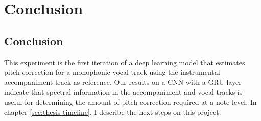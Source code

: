 \chapter{Conclusion}

\section{Conclusion}
This experiment is the first iteration of a deep learning model that estimates pitch correction for a monophonic vocal track using the instrumental accompaniment track as reference. Our results on a CNN with a GRU layer indicate that spectral information in the accompaniment and vocal tracks is useful for determining the amount of pitch correction required at a note level. In chapter \ref{sec:thesis-timeline}, I describe the next steps on this project.

